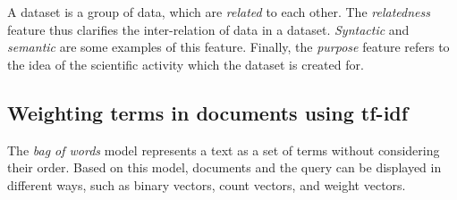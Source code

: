 \documentclass{IOS-Book-Article}
\begin{document}
A dataset is a group of data, which are \emph{related} to each other.
The \emph{relatedness} feature thus clarifies the inter-relation of data in a dataset.
\emph{Syntactic} and \emph{semantic} are some examples of this feature.   
Finally, the \emph{purpose} feature refers to the idea of the scientific activity which the dataset is created for.

\subsection{Weighting terms in documents using tf-idf}
\label{sec:tfidf}
The \emph{bag of words} model represents a text as a set of terms without considering their order.
Based on this model, documents and the query can be displayed in different ways, such as binary vectors, count vectors, and weight vectors.

\end{document}

